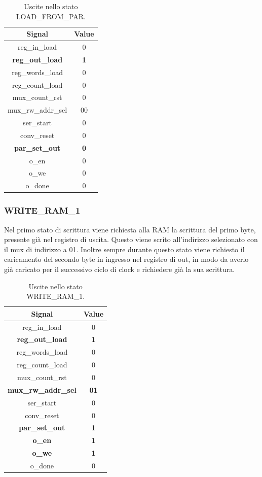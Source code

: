 \documentclass[a4paper]{report}
\begin{document}
\begin{table}[H]
  \centering
  \begin{tabular}{||c | c||} 
    \hline
    Signal & Value \\
    \hline\hline
    reg\_in\_load & 0 \\
    \textbf{reg\_out\_load} & \textbf{1} \\
    reg\_words\_load & 0 \\
    reg\_count\_load & 0 \\
    mux\_count\_rst & 0 \\
    mux\_rw\_addr\_sel & 00 \\
    ser\_start & 0 \\
    conv\_reset & 0 \\
    \textbf{par\_set\_out} & \textbf{0} \\
    o\_en & 0 \\
    o\_we & 0 \\
    o\_done & 0 \\
   \hline
  \end{tabular}
  \caption{Uscite nello stato LOAD\_FROM\_PAR.}
  \label{table:7}
\end{table}

\subsubsection{WRITE\_RAM\_1}
Nel primo stato di scrittura viene richiesta alla RAM la scrittura del primo byte, presente già nel registro di uscita. Questo viene scrito all'indirizzo selezionato con il mux di indirizzo a 01. Inoltre sempre durante questo stato viene richiesto il caricamento del secondo byte in ingresso nel registro di out, in modo da averlo già caricato per il successivo ciclo di clock e richiedere già la sua scrittura.
\begin{table}[H]
  \centering
  \begin{tabular}{||c | c||} 
    \hline
    Signal & Value \\
    \hline\hline
    reg\_in\_load & 0 \\
    \textbf{reg\_out\_load} & \textbf{1} \\
    reg\_words\_load & 0 \\
    reg\_count\_load & 0 \\
    mux\_count\_rst & 0 \\
    \textbf{mux\_rw\_addr\_sel} & \textbf{01} \\
    ser\_start & 0 \\
    conv\_reset & 0 \\
    \textbf{par\_set\_out} & \textbf{1} \\
    \textbf{o\_en} & \textbf{1} \\
    \textbf{o\_we} & \textbf{1} \\
    o\_done & 0 \\
   \hline
  \end{tabular}
  \caption{Uscite nello stato WRITE\_RAM\_1.}
  \label{table:8}
\end{table}
\end{document}
